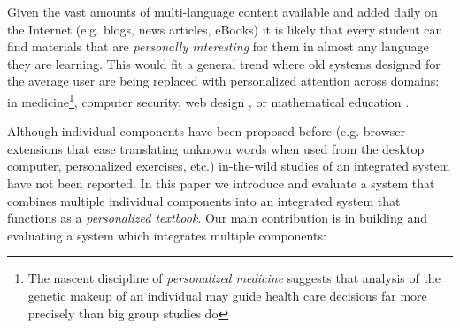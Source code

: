 

Given the vast amounts of multi-language content available and added daily on the Internet (e.g. blogs, news articles, eBooks) it is likely that every student can find materials that are {\em personally interesting} for them in almost any language they are learning. 
This would fit a general trend where old systems designed for the average user are being replaced with personalized attention across domains: in medicine\footnote{The nascent discipline of {\em personalized medicine} suggests that analysis of the genetic makeup of an individual may guide health care decisions far more precisely than big group studies do}, computer security,  web design \cite{Reinecke13-CulturalAdaptation}, or mathematical education \cite{Polozov15-AdaptableMath}. 
% 
% 
% 
% 
% 
% 
% 


Although individual components have been proposed before (e.g. browser extensions that ease translating unknown words when used from the desktop computer, personalized exercises, etc.) in-the-wild studies of an integrated system have not been reported. In this paper we introduce and evaluate a system that combines multiple individual components into an integrated system that functions as a {\em personalized textbook}. Our main contribution is in building and evaluating a system which integrates multiple components: 

